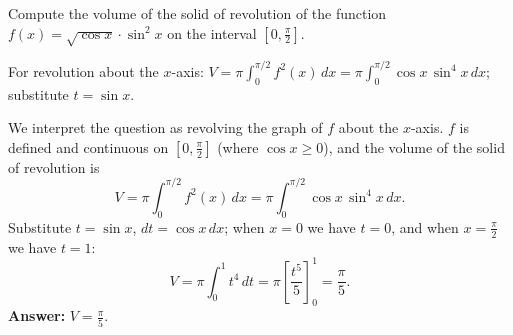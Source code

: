 
\begin{question}
Compute the volume of the solid of revolution of the function $f(x) = \sqrt{\cos x} \cdot \sin^2 x$ on the interval $[0, \frac{\pi}{2}]$.
\end{question}

\begin{hint}
For revolution about the $x$-axis: $V = \pi\int_0^{\pi/2} f^2(x)\,dx = \pi\int_0^{\pi/2}\cos x\,\sin^4 x\,dx$; substitute $t = \sin x$.
\end{hint}

\begin{solution}
We interpret the question as revolving the graph of $f$ about the $x$-axis. $f$ is defined and continuous on $[0, \frac{\pi}{2}]$ (where $\cos x \ge 0$), and the volume of the solid of revolution is
\[ V = \pi\int_0^{\pi/2} f^2(x)\,dx = \pi\int_0^{\pi/2} \cos x\,\sin^4 x\,dx. \]
Substitute $t = \sin x$, $dt = \cos x\,dx$; when $x = 0$ we have $t = 0$, and when $x = \frac{\pi}{2}$ we have $t = 1$:
\[ V = \pi\int_0^1 t^4\,dt = \pi\left[\frac{t^5}{5}\right]_0^1 = \frac{\pi}{5}. \]
\textbf{Answer:} $\boxed{V = \frac{\pi}{5}}$.
\end{solution}
